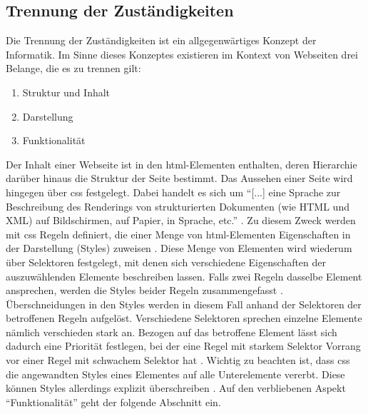         \subsection{Trennung der Zuständigkeiten}
            \label{section:problemAnalysisWebpagesInTheWWWSeparationOfConcerns}
            Die Trennung der Zuständigkeiten \cite{huersch:SeparationOfConcerns}
            ist ein allgegenwärtiges Konzept der Informatik.
            Im Sinne dieses Konzeptes existieren im Kontext von Webseiten
            drei Belange, die es zu trennen gilt:

            \begin{enumerate}
                \item Struktur und Inhalt
                \item Darstellung
                \item Funktionalität
            \end{enumerate}

            Der Inhalt einer Webseite ist in den \gls{html}-Elementen enthalten,
            deren Hierarchie darüber hinaus die Struktur der Seite bestimmt.
            Das Aussehen einer Seite wird hingegen über \gls{css} \cite{w3c:css} festgelegt.
            Dabei handelt es sich um "`[...] eine Sprache zur Beschreibung des Renderings
            von strukturierten Dokumenten (wie HTML und XML) auf Bildschirmen, auf Papier,
            in Sprache, etc."' \cite{w3c:css}.
            Zu diesem Zweck werden mit \gls{css} Regeln definiert,
            die einer Menge von \gls{html}-Elementen Eigenschaften in der Darstellung (Styles) zuweisen
            \cite{w3c:cssSyntax}.
            Diese Menge von Elementen wird wiederum über Selektoren \cite{w3c:cssSelectors} festgelegt,
            mit denen sich verschiedene Eigenschaften der auszuwählenden Elemente beschreiben lassen.
            Falls zwei Regeln dasselbe Element ansprechen,
            werden die Styles beider Regeln zusammengefasst
            \cite{w3c:cssCascading}.
            Überschneidungen in den Styles werden in diesem Fall anhand der Selektoren der betroffenen Regeln aufgelöst.
            Verschiedene Selektoren sprechen einzelne Elemente nämlich verschieden stark an.
            Bezogen auf das betroffene Element lässt sich dadurch eine Priorität festlegen,
            bei der eine Regel mit starkem Selektor Vorrang vor einer Regel mit schwachem Selektor hat
            \cite{w3c:cssSelectors}. 
            Wichtig zu beachten ist, dass \gls{css} die angewandten Styles eines Elementes auf alle Unterelemente vererbt.
            Diese können Styles allerdings explizit überschreiben
            \cite{w3c:cssCascading}.
            Auf den verbliebenen Aspekt "`Funktionalität"' geht der folgende Abschnitt ein.

